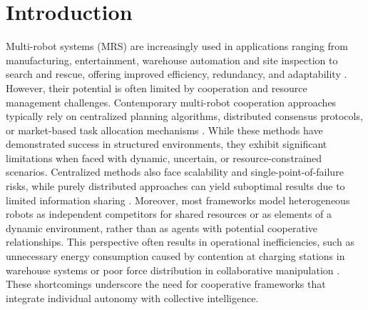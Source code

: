 \documentclass[Afour,sageh,times]{sagej}
\begin{document}

\maketitle

\section{Introduction}
\label{sec:intro}
Multi-robot systems (MRS) are increasingly used in applications ranging from manufacturing, entertainment, warehouse automation and site inspection to search and rescue, offering improved efficiency, redundancy, and adaptability \citep{parker2008Distributed, yan2013Survey, laviers2025Robots}. However, their potential is often limited by cooperation and resource management challenges. Contemporary multi-robot cooperation approaches typically rely on centralized planning algorithms, distributed consensus protocols, or market-based task allocation mechanisms \citep{gerkey2004formal, khamis2015Multirobot}. While these methods have demonstrated success in structured environments, they exhibit significant limitations when faced with dynamic, uncertain, or resource-constrained scenarios. Centralized methods also face scalability and single-point-of-failure risks, while purely distributed approaches can yield suboptimal results due to limited information sharing \citep{gerkey2004formal, khamis2015Multirobot, farinelli2017Distributed}. Moreover, most frameworks model heterogeneous robots as independent competitors for shared resources or as elements of a dynamic environment, rather than as agents with potential cooperative relationships. This perspective often results in operational inefficiencies, such as unnecessary energy consumption caused by contention at charging stations in warehouse systems \citep{riazi2021Energy} or poor force distribution in collaborative manipulation \citep{erden2008Free}. These shortcomings underscore the need for cooperative frameworks that integrate individual autonomy with collective intelligence. 
\end{document}

